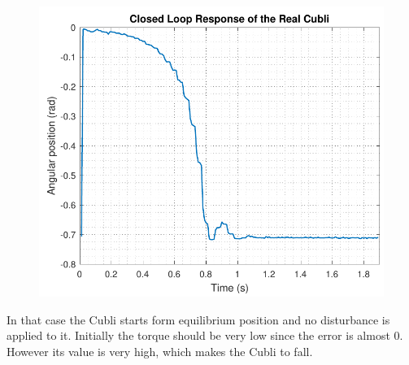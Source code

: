 \begin{minipage}{0.45\linewidth}
	\begin{figure}[H]\vspace{-0mm}
		\centering
		\includegraphics[scale=.53]{figures/positionTestTustinPre}
		\captionsetup{justification=centering}
		\label{positionTustinPre}
	\end{figure}\vspace{-5mm}
\end{minipage}

 In that case the Cubli starts form equilibrium position and no disturbance is applied to it. Initially the torque should be very low since the error is almost 0. However its value is very high, which makes
 the Cubli to fall. 
 

